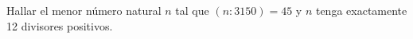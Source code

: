 \begin{enunciado}{\ejercicio}
        Hallar el menor número natural $n$ tal que $(n : 3150) = 45$ y $n$ tenga exactamente 12 divisores positivos.
\end{enunciado}
